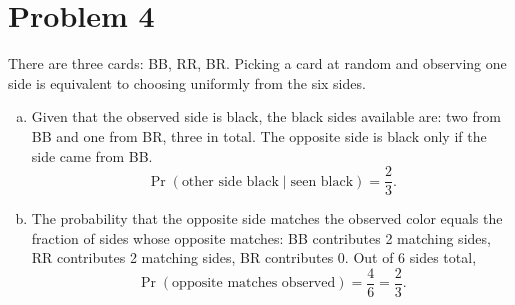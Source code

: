 \section*{Problem 4}

There are three cards: BB, RR, BR. Picking a card at random and observing one side is equivalent to choosing uniformly from the six sides.

\begin{enumerate}[(a)]
\item Given that the observed side is black, the black sides available are: two from BB and one from BR, three in total. The opposite side is black only if the side came from BB. 
\[
\Pr(\text{other side black}\mid \text{seen black})=\frac{2}{3}.
\]

\item The probability that the opposite side matches the observed color equals the fraction of sides whose opposite matches:
BB contributes 2 matching sides, RR contributes 2 matching sides, BR contributes 0. Out of 6 sides total,
\[
\Pr(\text{opposite matches observed})=\frac{4}{6}=\frac{2}{3}.
\]
\end{enumerate}
